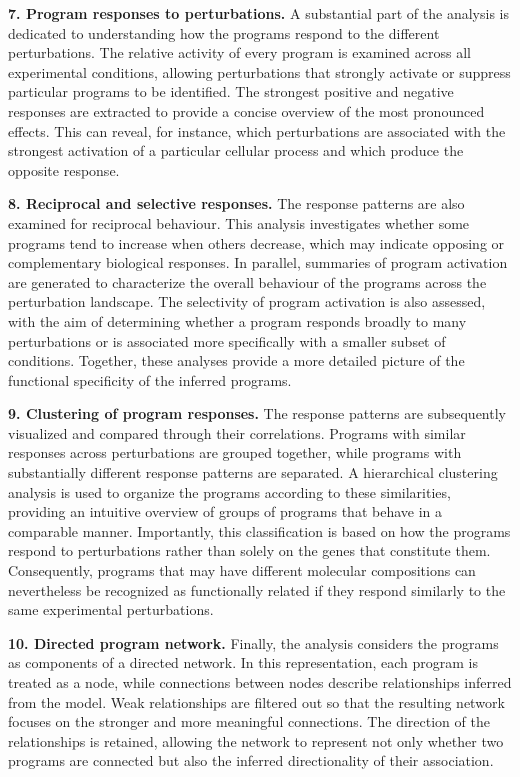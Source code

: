 \documentclass[11pt,a4paper]{article}
\begin{document}
\textbf{7. Program responses to perturbations.} A substantial part of the analysis is dedicated to understanding how the programs respond to the different perturbations. The relative activity of every program is examined across all experimental conditions, allowing perturbations that strongly activate or suppress particular programs to be identified. The strongest positive and negative responses are extracted to provide a concise overview of the most pronounced effects. This can reveal, for instance, which perturbations are associated with the strongest activation of a particular cellular process and which produce the opposite response.

\textbf{8. Reciprocal and selective responses.} The response patterns are also examined for reciprocal behaviour. This analysis investigates whether some programs tend to increase when others decrease, which may indicate opposing or complementary biological responses. In parallel, summaries of program activation are generated to characterize the overall behaviour of the programs across the perturbation landscape. The selectivity of program activation is also assessed, with the aim of determining whether a program responds broadly to many perturbations or is associated more specifically with a smaller subset of conditions. Together, these analyses provide a more detailed picture of the functional specificity of the inferred programs.

\textbf{9. Clustering of program responses.} The response patterns are subsequently visualized and compared through their correlations. Programs with similar responses across perturbations are grouped together, while programs with substantially different response patterns are separated. A hierarchical clustering analysis is used to organize the programs according to these similarities, providing an intuitive overview of groups of programs that behave in a comparable manner. Importantly, this classification is based on how the programs respond to perturbations rather than solely on the genes that constitute them. Consequently, programs that may have different molecular compositions can nevertheless be recognized as functionally related if they respond similarly to the same experimental perturbations.

\textbf{10. Directed program network.} Finally, the analysis considers the programs as components of a directed network. In this representation, each program is treated as a node, while connections between nodes describe relationships inferred from the model. Weak relationships are filtered out so that the resulting network focuses on the stronger and more meaningful connections. The direction of the relationships is retained, allowing the network to represent not only whether two programs are connected but also the inferred directionality of their association.
\end{document}
